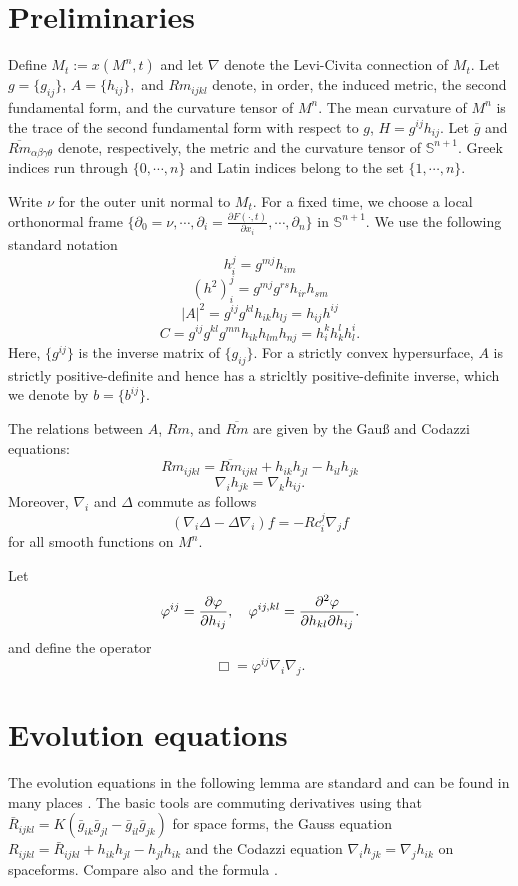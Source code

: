 \documentclass{amsart}
\theoremstyle{definition}
\theoremstyle{remark}
\numberwithin{equation}{section}
\begin{document}
\section{Preliminaries}

Define \(M_t := x(M^n,t)\) and let $\nabla$ denote the Levi-Civita connection of $M_t$. Let $g = \{g_{ij}\}$, $A = \{h_{ij}\},$ and $Rm_{ijkl}$ denote, in order, the induced metric, the second fundamental form, and the curvature tensor of $M^n$. The mean curvature of $M^n$ is the trace of the second fundamental form with respect to $g$, $H = g^{ij}h_{ij}$. Let $\overline{g}$ and $\overline{Rm}_{\alpha\beta\gamma\theta}$ denote, respectively, the metric and the curvature tensor of $\mathbb{S}^{n+1}$. Greek indices run through $\{0,\cdots,n\}$ and Latin indices belong to the set $\{1,\cdots,n\}.$

Write $\nu$ for the outer unit normal to $M_t.$ For a fixed time, we choose a local orthonormal frame $\{\partial_0=\nu, \cdots, \partial_i=\frac{\partial F(\cdot,t)}{\partial x_i}, \cdots, \partial_n\}$ in $\mathbb{S}^{n+1}.$ We use the following standard notation
\[
h_i^j = g^{mj}h_{im}
\]
\[
(h^2)_i^j = g^{mj}g^{rs}h_{ir}h_{sm}
\]
\[
|A|^2 = g^{ij}g^{kl}h_{ik}h_{lj} = h_{ij}h^{ij}
\]
\[
C = g^{ij}g^{kl}g^{mn}h_{ik}h_{lm}h_{nj} = h_i^kh_k^lh_l^i.
\]
Here, $\{g^{ij}\}$ is the inverse matrix of $\{g_{ij}\}.$ For a strictly convex hypersurface, \(A\) is strictly positive-definite and hence has a stricltly positive-definite inverse, which we denote by \(b = \{b^{ij}\}\).


The relations between $A$, $Rm$, and $\overline{Rm}$ are given by the Gau{\ss} and Codazzi equations:
\[
Rm_{ijkl} =\overline{Rm}_{ijkl} +h_{ik}h_{jl} - h_{il}h_{jk}
\]
\[
\nabla_ih_{jk} = \nabla_{k}h_{ij}.
\]
Moreover, $\nabla_i$ and $\Delta$ commute as follows
\[
(\nabla_i\Delta - \Delta\nabla_i)f = -Rc_i^j \nabla_j f
\]
for all smooth functions on $M^n.$

Let 
\[
\varphi^{ij} = \frac{\partial\varphi}{\partial h_{ij}}, \quad \varphi^{ij,kl} = \frac{\partial^2\varphi}{\partial h_{kl} \partial h_{ij}}.
\]
and define the operator
\[
\Box = \varphi^{ij} \nabla_i \nabla_j.
\]

\section{Evolution equations}

The evolution equations in the following lemma are standard and can be found in many places \cite{MR1316556, MR1100812, MR1296393, MR1480081}. The basic tools are commuting derivatives using that \(\bar{R}_{ijkl} = K(\bar{g}_{ik}\bar{g}_{jl} - \bar{g}_{il}\bar{g}_{jk})\) for space forms, the Gauss equation \(R_{ijkl} = \bar{R}_{ijkl} + h_{ik}h_{jl} - h_{jl}h_{ik}\) and the Codazzi equation \(\nabla_i h_{jk} = \nabla_j h_{ik}\) on spaceforms. Compare also \cite[p.~94-95]{Gerhardt:/2006} and the formula \cite[eq.~(6.17)]{Gerhardt:01/1996}.
\end{document}
